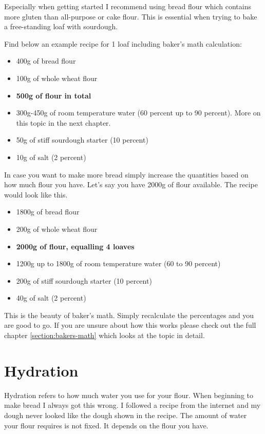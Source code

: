 Especially when getting started I recommend using bread flour which
contains more gluten than all-purpose or cake flour. This is essential
when trying to bake a free-standing loaf with sourdough.

Find below an example recipe for 1 loaf including baker's math calculation:

\begin{itemize}
  \item 400g of bread flour
  \item 100g of whole wheat flour
  \item \textbf{500g of flour in total}
  \item 300g-450g of room temperature water (60 percent up to 90 percent). More on
this topic in the next chapter.
  \item 50g of stiff sourdough starter (10 percent)
  \item 10g of salt (2 percent)
\end{itemize}

In case you want to make more bread simply increase the quantities based on
how much flour you have. Let's say you have 2000g of flour available. The
recipe would look like this.

\begin{itemize}
  \item 1800g of bread flour
  \item 200g of whole wheat flour
  \item \textbf{2000g of flour, equalling 4 loaves}
  \item 1200g up to 1800g of room temperature water (60 to 90 percent)
  \item 200g of stiff sourdough starter (10 percent)
  \item 40g of salt (2 percent)
\end{itemize}

This is the beauty of baker's math. Simply recalculate the percentages and you
are good to go. If you are unsure about how this works please check out the
full chapter \ref{section:bakers-math} which looks at the topic in detail.

\section{Hydration}

Hydration refers to how much water you use for your flour. When
beginning to make bread I always got this wrong. I followed a recipe from the
internet and my dough never looked like the dough shown in the recipe.
The amount of water your flour requires is not fixed. It depends on the flour
you have.

